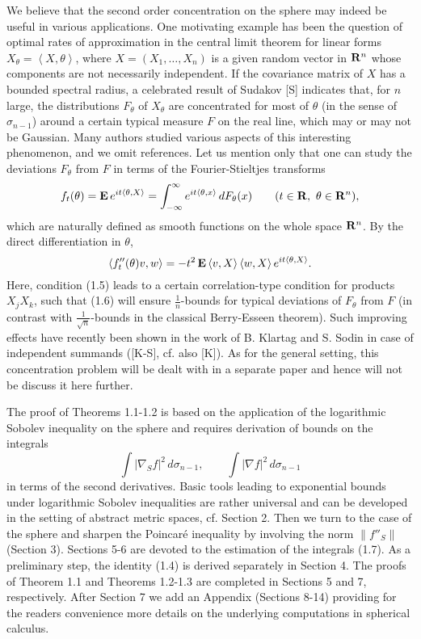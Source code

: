 \documentclass[reqno,12pt]{amsart}
\theoremstyle{plain}
\begin{document}
\vskip2mm
We believe that the second order concentration on the sphere may indeed
be useful in various applications. One motivating example has been the 
question of optimal rates of approximation in the central limit 
theorem for linear forms $X_\theta = \left<X,\theta\right>$, where 
$X = (X_1,\dots,X_n)$ is a given random vector in ${{\bf R}}^n$ whose components 
are not necessarily independent. If the covariance matrix of $X$ has 
a bounded spectral radius, a celebrated result of Sudakov [S] indicates 
that, for $n$ large, the distributions $F_\theta$ of $X_\theta$ are 
concentrated for most of $\theta$ (in the sense of $\sigma_{n-1}$) around 
a certain typical measure $F$ on the real line, which may or may not be 
Gaussian. Many authors studied various aspects of this interesting
phenomenon, and we omit references. 
Let us mention only that one can study the deviations $F_\theta$ 
from $F$ in terms of the Fourier-Stieltjes transforms
$$
f_t(\theta) = {{\bf E}}\,e^{it\left<\theta,X\right>} = 
\int_{-\infty}^{\infty} e^{it\left<\theta,x\right>}\,dF_\theta(x) \qquad
(t \in {{\bf R}}, \ \theta \in {{\bf R}}^n),
$$
which are naturally defined as smooth functions on the whole space 
${{\bf R}}^n$. By the direct differentiation in $\theta$,
$$
\left<f_t''(\theta)v,w\right> = -t^2\,
{{\bf E}} \left<v,X\right> \left<w,X\right> e^{it\left<\theta,X\right>}.
$$
Here, condition (1.5) leads to a certain correlation-type condition for 
products $X_j X_k$, such that (1.6) will ensure $\frac{1}{n}$-bounds for 
typical deviations of $F_\theta$ from $F$ (in contrast with 
$\frac{1}{\sqrt{n}}$-bounds in the classical Berry-Esseen theorem).
Such improving effects have recently been shown in the work of
B. Klartag and S. Sodin in case of independent summands ([K-S], cf. also [K]). 
As for the general setting, this concentration problem will be dealt 
with in a separate paper and hence will not be discuss it here further.

The proof of Theorems 1.1-1.2 is based on the application of the
logarithmic Sobolev inequality on the sphere and requires derivation 
of bounds on the integrals
\begin{equation}
\int |\nabla_S f|^2\,d\sigma_{n-1}, \qquad
\int |\nabla f|^2\,d\sigma_{n-1}
\end{equation}
in terms of the second derivatives. Basic tools leading to exponential 
bounds under logarithmic Sobolev inequalities are rather universal and 
can be developed in the setting of abstract metric spaces, cf. Section 2.
Then we turn to the case of the sphere and sharpen the Poincar\'e inequality 
by involving the norm $\|f''_S\|$ (Section 3). Sections 5-6 are devoted 
to the estimation of the integrals (1.7). As a preliminary step, 
the identity (1.4) is derived separately in Section 4.
The proofs of Theorem 1.1 and Theorems 1.2-1.3 are completed in Sections 
5 and 7, respectively. After Section 7 we add an Appendix (Sections 8-14)
providing for the readers convenience more details on the underlying 
computations in spherical calculus.
\end{document}
